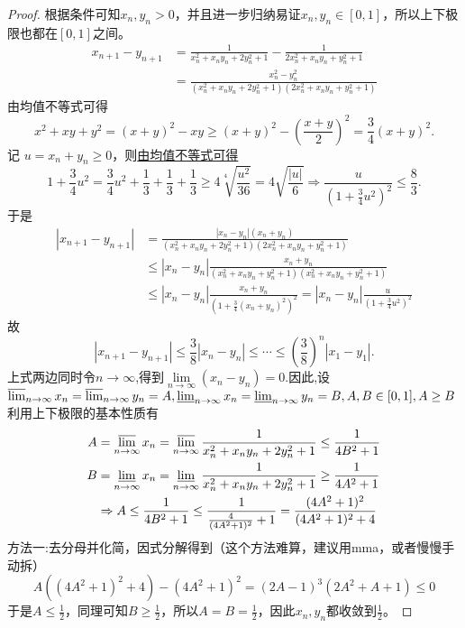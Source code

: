 \documentclass[../../main.tex]{subfiles}
\begin{document}
\begin{proof}
根据条件可知\(x_n,y_n > 0\)，并且进一步归纳易证\(x_n,y_n\in[0,1]\)，所以上下极限也都在\([0,1]\)之间。
\begin{align*}
x_{n + 1}-y_{n + 1}&=\frac{1}{x_n^2 + x_ny_n + 2y_n^2 + 1}-\frac{1}{2x_n^2 + x_ny_n + y_n^2 + 1}\\
&=\frac{x_n^2 - y_n^2}{(x_n^2 + x_ny_n + 2y_n^2 + 1)(2x_n^2 + x_ny_n + y_n^2 + 1)}
\end{align*}
由均值不等式可得
\[
x^2 + xy + y^2=(x + y)^2 - xy\geqslant (x + y)^2 - \left(\frac{x + y}{2}\right)^2=\frac{3}{4}(x + y)^2.
\]
记 \(u = x_n + y_n\geq 0\)，则\hyperlink{均值放缩的思路}{由均值不等式可得}
\[
1+\frac{3}{4}u^2=\frac{3}{4}u^2+\frac{1}{3}+\frac{1}{3}+\frac{1}{3}\geq 4\sqrt[4]{\frac{u^2}{36}}=4\sqrt{\frac{|u|}{6}}\Rightarrow \frac{u}{(1+\frac{3}{4}u^2)^2}\le \frac{8}{3}.
\]
于是
\begin{align*}
|x_{n + 1}-y_{n + 1}|&=\frac{|x_n - y_n|(x_n + y_n)}{(x_{n}^{2}+x_ny_n + 2y_{n}^{2}+1)(2x_{n}^{2}+x_ny_n + y_{n}^{2}+1)}\\
&\le |x_n - y_n|\frac{x_n + y_n}{(x_{n}^{2}+x_ny_n + y_{n}^{2}+1)(x_{n}^{2}+x_ny_n + y_{n}^{2}+1)}\\
&\le |x_n - y_n|\frac{x_n + y_n}{(1+\frac{3}{4}(x_n + y_n)^2)^2}=|x_n - y_n|\frac{u}{(1+\frac{3}{4}u^2)^2}
\end{align*}
故
\[
|x_{n + 1}-y_{n + 1}|\le \frac{3}{8}|x_n - y_n|\le \cdots \le (\frac{3}{8})^n|x_1 - y_1|.
\]
上式两边同时令$n\to \infty$,得到$\underset{n\rightarrow \infty}{\lim}\left( x_n-y_n \right) =0$.因此,设
\(\varlimsup_{n\rightarrow\infty}x_n=\varlimsup_{n\rightarrow\infty}y_n = A,\varliminf_{n\rightarrow\infty}x_n=\varliminf_{n\rightarrow\infty}y_n = B,A,B\in[0,1],A\geq B\)
利用上下极限的基本性质有
\begin{align*}
A&=\varlimsup_{n\rightarrow\infty}x_n=\varlimsup_{n\rightarrow\infty}\frac{1}{x_n^2 + x_ny_n + 2y_n^2 + 1}\leq\frac{1}{4B^2 + 1}\\
B&=\varliminf_{n\rightarrow\infty}x_n=\varliminf_{n\rightarrow\infty}\frac{1}{x_n^2 + x_ny_n + 2y_n^2 + 1}\geq\frac{1}{4A^2 + 1}\\
&\Rightarrow A\leq\frac{1}{4B^2 + 1}\leq\frac{1}{\frac{4}{(4A^2 + 1)^2}+1}=\frac{(4A^2 + 1)^2}{(4A^2 + 1)^2 + 4}
\end{align*}
{\color{blue}方法一:}去分母并化简，因式分解得到（这个方法难算，建议用mma，或者慢慢手动拆）
\[A((4A^2 + 1)^2 + 4)-(4A^2 + 1)^2=(2A - 1)^3(2A^2 + A + 1)\leq0\]
于是\(A\leq\frac{1}{2}\)，同理可知\(B\geq\frac{1}{2}\)，所以\(A = B=\frac{1}{2}\)，因此\(x_n,y_n\)都收敛到\(\frac{1}{2}\)。


\end{proof}
\end{document}
